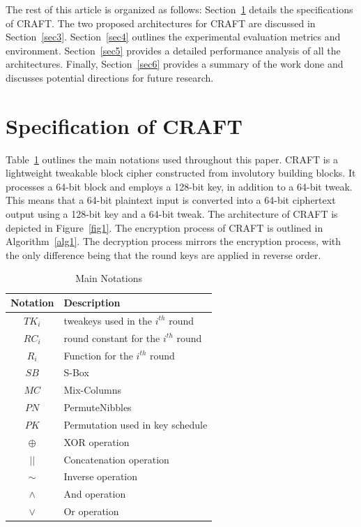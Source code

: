 \documentclass[final,5p,times,twocolumn]{elsarticle}
\begin{document}
The rest of this article is organized as follows: Section~\ref{sec2} details the specifications of CRAFT. The two proposed architectures for CRAFT are discussed in Section~\ref{sec3}. Section~\ref{sec4} outlines the experimental evaluation metrics and environment. Section~\ref{sec5} provides a detailed performance analysis of all the architectures. Finally, Section~\ref{sec6} provides a summary of the work done and discusses potential directions for future research.

\section{Specification of CRAFT}\label{sec2}

Table~\ref{tab1} outlines the main notations used throughout this paper.
CRAFT is a lightweight tweakable block cipher constructed from involutory building blocks.
It processes a 64-bit block and employs a 128-bit key, in addition to a 64-bit tweak.
This means that a 64-bit plaintext input is converted into a 64-bit ciphertext output using a 128-bit key and a 64-bit tweak.
The architecture of CRAFT is depicted in Figure~\ref{fig1}.
The encryption process of CRAFT is outlined in Algorithm~\ref{alg1}.
The decryption process mirrors the encryption process, with the only difference being that the round keys are applied in reverse order.


\begin{table}[h]
    \centering
    \caption{Main Notations}\label{tab1}%
    \begin{tabular}{|c|l|}
        \hline
        Notation & Description                           \\
        \hline
        $TK_i$   & tweakeys used in the $i^{th}$ round   \\
        $RC_i$   & round constant for the $i^{th}$ round \\
        $R_i$    & Function for the $i^{th}$ round       \\
        $SB$     & S-Box                                 \\
        $MC$     & Mix-Columns                           \\
        $PN$     & PermuteNibbles                        \\
        $PK$     & Permutation used in key schedule      \\
        $\oplus$ & XOR operation                         \\
        $||$     & Concatenation operation               \\
        $\sim$   & Inverse operation                     \\
        $\land$  & And operation                         \\
        $\lor$   & Or operation                          \\
        \hline
    \end{tabular}
\end{table}
\end{document}

